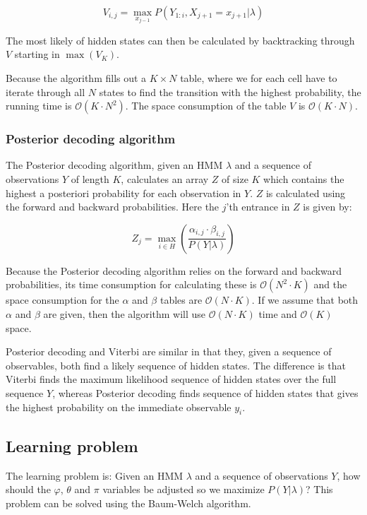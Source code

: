 $$V_{i,j} = \max\limits_{x_{j-1}} P(Y_{1:i}, X_{j+1} = x_{j+1}|\lambda)$$

The most likely of hidden states can then be calculated by backtracking through $V$ starting in $\max(V_K)$.

Because the algorithm fills out a $ K \times  N $ table, where we for each cell have to iterate through all $ N $ states to find the transition with the highest probability, the running time is $\mathcal{O}(K \cdot  N ^2)$. The space consumption of the table $V$ is $\mathcal{O}(K \cdot  N )$.

\subsubsection{Posterior decoding algorithm}

The Posterior decoding algorithm\cite{Bishop}, given an HMM $\lambda$ and a sequence of observations $Y$ of length $K$, calculates an array $Z$ of size $K$ which contains the highest a posteriori probability for each observation in $Y$. 
$Z$ is calculated using the forward and backward probabilities. Here the $j$'th entrance in $Z$ is given by:

$$Z_j = \max\limits_{i\in H} (\frac{\alpha_{i,j}\cdot\beta_{i,j}}{P(Y|\lambda)})$$

Because the Posterior decoding algorithm relies on the forward and backward probabilities, its time consumption for calculating these is $\mathcal{O}( N^2\cdot K)$ and the space consumption for the $\alpha$ and $\beta$ tables are $\mathcal{O}( N\cdot K)$. If we assume that both $\alpha$ and $\beta$ are given, then the algorithm will use $\mathcal{O}( N\cdot K)$ time and $\mathcal{O}(K)$
space.

Posterior decoding and Viterbi are similar in that they, given a sequence of observables, both find a likely sequence of hidden states. The difference is that Viterbi finds the maximum likelihood sequence of hidden states over the full sequence $Y$, whereas Posterior decoding finds sequence of hidden states that gives the highest probability on the immediate observable $y_i$.

\subsection{Learning problem}

The learning problem is: Given an HMM $\lambda$ and a sequence of observations $Y$, how should the $\varphi$, $\theta$ and $\pi$ variables be adjusted so we maximize $P(Y|\lambda)$? This problem can be solved using the Baum-Welch algorithm.

